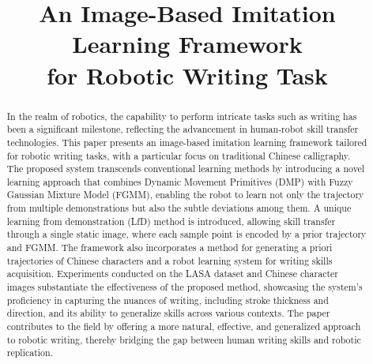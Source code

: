 \documentclass[conference]{IEEEtran}
\begin{document}
\title{An Image-Based Imitation Learning Framework \\ for Robotic Writing Task}
\author{
\and
{}
}
\maketitle
\begin{abstract}
In the realm of robotics, the capability to perform intricate tasks such as writing has been a significant milestone, reflecting the advancement in human-robot skill transfer technologies. This paper presents an image-based imitation learning framework tailored for robotic writing tasks, with a particular focus on traditional Chinese calligraphy. The proposed system transcends conventional learning methods by introducing a novel learning approach that combines Dynamic Movement Primitives (DMP) with Fuzzy Gaussian Mixture Model (FGMM), enabling the robot to learn not only the trajectory from multiple demonstrations but also the subtle deviations among them. A unique learning from demonstration (LfD) method is introduced, allowing skill transfer through a single static image, where each sample point is encoded by a prior trajectory and FGMM. The framework also incorporates a method for generating a priori trajectories of Chinese characters and a robot learning system for writing skills acquisition. Experiments conducted on the LASA dataset and Chinese character images substantiate the effectiveness of the proposed method, showcasing the system's proficiency in capturing the nuances of writing, including stroke thickness and direction, and its ability to generalize skills across various contexts. The paper contributes to the field by offering a more natural, effective, and generalized approach to robotic writing, thereby bridging the gap between human writing skills and robotic replication.
\end{abstract}
\end{document}
